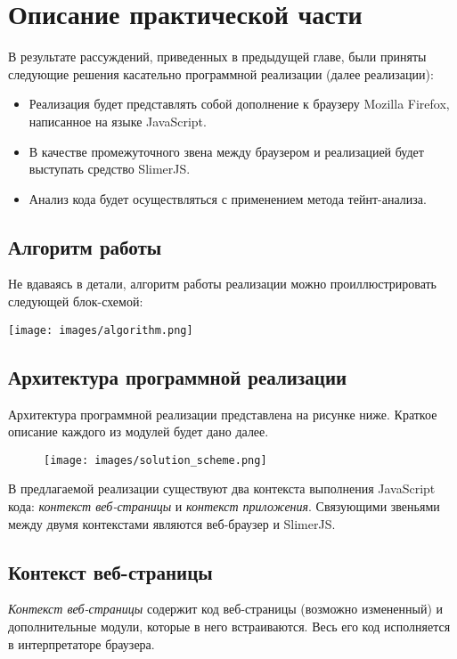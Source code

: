 
\chapter{Описание практической части}\label{Implementation}

В результате рассуждений, приведенных в предыдущей главе, были приняты следующие решения касательно программной реализации (далее реализации):

\bigskip
\begin{itemize}
	\item Реализация будет представлять собой дополнение к браузеру Mozilla Firefox, написанное на языке JavaScript.
	\item В качестве промежуточного звена между браузером и реализацией будет выступать средство SlimerJS.
	\item Анализ кода будет осуществляться с применением метода тейнт-анализа.
\end{itemize}

\section{Алгоритм работы}
Не вдаваясь в детали, алгоритм работы реализации можно проиллюстрировать следующей блок-схемой:

\texttt{[image: images/algorithm.png]}
\newpage


\section{Архитектура программной реализации}
Архитектура программной реализации представлена на рисунке ниже. Краткое описание каждого из модулей будет дано далее.

\begin{figure}[h]
	\texttt{[image: images/solution\_scheme.png]}
\end{figure}
\bigskip

В предлагаемой реализации существуют два контекста выполнения JavaScript кода: \textit{контекст веб-страницы} и \textit{контекст приложения}. Связующими звеньями между двумя контекстами являются веб-браузер и SlimerJS.

\section{Контекст веб-страницы}
\textit{Контекст веб-страницы} содержит код веб-страницы (возможно измененный) и дополнительные модули, которые в него встраиваются. Весь его код исполняется в интерпретаторе браузера. 

